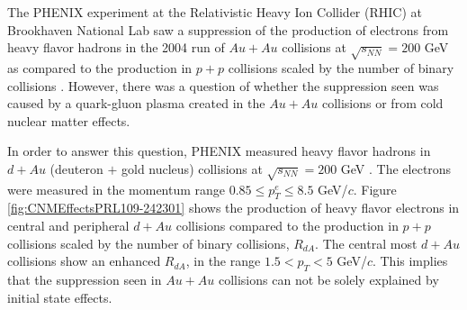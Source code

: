 
The PHENIX experiment at the Relativistic Heavy Ion Collider (RHIC) at Brookhaven National Lab saw a suppression of the production of electrons from heavy flavor hadrons in the 2004 run of $Au+Au$ collisions at $\sqrt{s_{NN}} = 200$ GeV as compared to the production in $p + p$ collisions scaled by the number of binary collisions \cite{Adare:2006nq}. However, there was a question of whether the suppression seen was caused by a quark-gluon plasma created in the $Au+Au$ collisions or from cold nuclear matter effects.



In order to answer this question, PHENIX measured heavy flavor hadrons in $d + Au$ (deuteron $+$ gold nucleus) collisions at $\sqrt{s_{NN}} = 200$ GeV \cite{Adare:2012yxa}. The electrons were measured in the momentum range $0.85 \leq p_{T}^{e} \leq 8.5$ GeV/$c$. Figure \ref{fig:CNMEffectsPRL109-242301} shows the production of heavy flavor electrons in central and peripheral $d + Au$ collisions compared to the production in $p + p$ collisions scaled by the number of binary collisions, $R_{dA}$. The central most $d + Au$ collisions show an enhanced $R_{dA}$, in the range $1.5 < p_{T} < 5$ GeV/$c$. This implies that the suppression seen in $Au+Au$ collisions \cite{Adare:2006nq} can not be solely explained by initial state effects.






